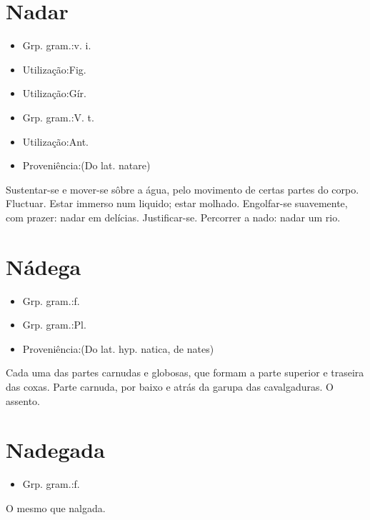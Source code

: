 \section{Nadar}
\begin{itemize}
\item {Grp. gram.:v. i.}
\end{itemize}
\begin{itemize}
\item {Utilização:Fig.}
\end{itemize}
\begin{itemize}
\item {Utilização:Gír.}
\end{itemize}
\begin{itemize}
\item {Grp. gram.:V. t.}
\end{itemize}
\begin{itemize}
\item {Utilização:Ant.}
\end{itemize}
\begin{itemize}
\item {Proveniência:(Do lat. \textunderscore natare\textunderscore )}
\end{itemize}
Sustentar-se e mover-se sôbre a água, pelo movimento de certas partes do corpo.
Fluctuar.
Estar immerso num liquido; estar molhado.
Engolfar-se suavemente, com prazer: \textunderscore nadar em delícias\textunderscore .
Justificar-se.
Percorrer a nado: \textunderscore nadar um rio\textunderscore .
\section{Nádega}
\begin{itemize}
\item {Grp. gram.:f.}
\end{itemize}
\begin{itemize}
\item {Grp. gram.:Pl.}
\end{itemize}
\begin{itemize}
\item {Proveniência:(Do lat. hyp. \textunderscore natica\textunderscore , de \textunderscore nates\textunderscore )}
\end{itemize}
Cada uma das partes carnudas e globosas, que formam a parte superior e traseira das coxas.
Parte carnuda, por baixo e atrás da garupa das cavalgaduras.
O assento.
\section{Nadegada}
\begin{itemize}
\item {Grp. gram.:f.}
\end{itemize}
O mesmo que \textunderscore nalgada\textunderscore .
